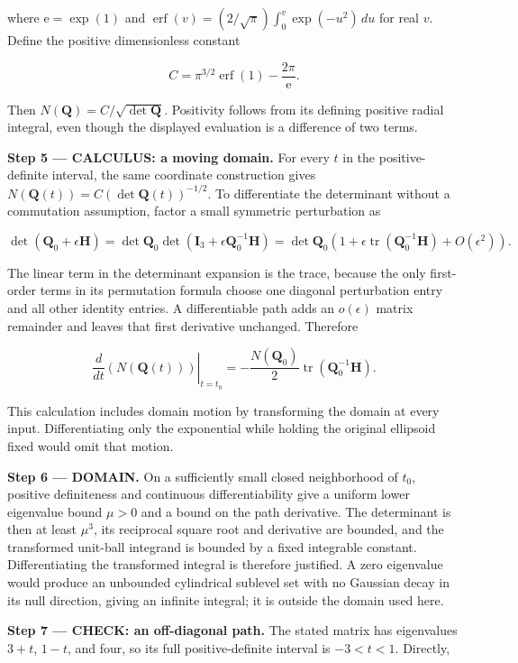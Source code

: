 \documentclass[11pt,oneside,openany]{book}
\begin{document}
where \(\mathrm e=\exp(1)\) and \(\operatorname{erf}(v)=(2/\sqrt\pi)\int_0^v\exp(-u^2)\,du\) for real \(v\). Define the positive dimensionless constant

\[
C=\pi^{3/2}\operatorname{erf}(1)-\frac{2\pi}{\mathrm e}.
\]

Then \(N(\mathbf Q)=C/\sqrt{\det\mathbf Q}\). Positivity follows from its defining positive radial integral, even though the displayed evaluation is a difference of two terms.

\endgroup
\textbf{Step 5 --- CALCULUS: a moving domain.} For every \(t\) in the positive-definite interval, the same coordinate construction gives \(N(\mathbf Q(t))=C(\det\mathbf Q(t))^{-1/2}\). To differentiate the determinant without a commutation assumption, factor a small symmetric perturbation as

\[
\det(\mathbf Q_0+\epsilon\mathbf H)
=\det\mathbf Q_0\det(\mathbf I_3+\epsilon\mathbf Q_0^{-1}\mathbf H)
=\det\mathbf Q_0\left(1+\epsilon\operatorname{tr}(\mathbf Q_0^{-1}\mathbf H)+O(\epsilon^2)\right).
\]

The linear term in the determinant expansion is the trace, because the only first-order terms in its permutation formula choose one diagonal perturbation entry and all other identity entries. A differentiable path adds an \(o(\epsilon)\) matrix remainder and leaves that first derivative unchanged. Therefore

\[
\left.\frac{d}{dt}(N(\mathbf Q(t)))\right|_{t=t_0}
=-\frac{N(\mathbf Q_0)}{2}\operatorname{tr}(\mathbf Q_0^{-1}\mathbf H).
\]

This calculation includes domain motion by transforming the domain at every input. Differentiating only the exponential while holding the original ellipsoid fixed would omit that motion.

\begin{DomainStep}
\textbf{Step 6 --- DOMAIN.} On a sufficiently small closed neighborhood of \(t_0\), positive definiteness and continuous differentiability give a uniform lower eigenvalue bound \(\mu>0\) and a bound on the path derivative. The determinant is then at least \(\mu^3\), its reciprocal square root and derivative are bounded, and the transformed unit-ball integrand is bounded by a fixed integrable constant. Differentiating the transformed integral is therefore justified. A zero eigenvalue would produce an unbounded cylindrical sublevel set with no Gaussian decay in its null direction, giving an infinite integral; it is outside the domain used here.

\end{DomainStep}
\textbf{Step 7 --- CHECK: an off-diagonal path.} The stated matrix has eigenvalues \(3+t\), \(1-t\), and four, so its full positive-definite interval is \(-3<t<1\). Directly,
\end{document}
